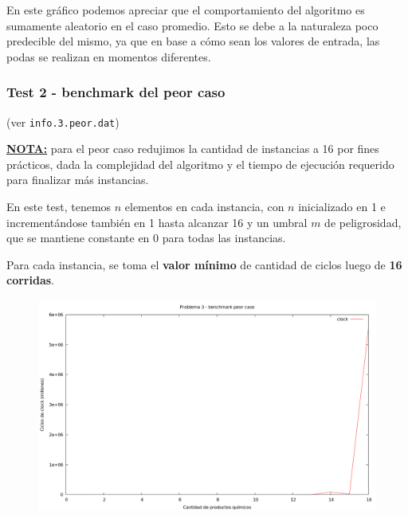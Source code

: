 \vspace*{0.5cm}

En este gráfico podemos apreciar que el comportamiento del algoritmo es
sumamente aleatorio en el caso promedio. Esto se debe a la naturaleza poco
predecible del mismo, ya que en base a cómo sean los valores de entrada, las
podas se realizan en momentos diferentes.


\newpage
\subsubsection{Test 2 - benchmark del peor caso}

(ver \verb|info.3.peor.dat|) \medskip

\underline{\textbf{NOTA:}} para el peor caso redujimos la cantidad de instancias a 16 por fines prácticos, dada la complejidad
del algoritmo y el tiempo de ejecución requerido para finalizar más instancias. \medskip

En este test, tenemos $n$ elementos en cada instancia, con $n$ inicializado en 1 e incrementándose
también en 1 hasta alcanzar 16 y un umbral $m$ de peligrosidad, que se mantiene constante en 0 para todas las
instancias.

Para cada instancia, se toma el \textbf{valor mínimo} de cantidad de ciclos luego de \textbf{16 corridas}.

\vspace*{0.5cm}

\begin{figure}[h]
  \begin{center}
    \includegraphics[scale=0.35]{imagenes/grafico-3-peor.png}
  \end{center}
\end{figure}

